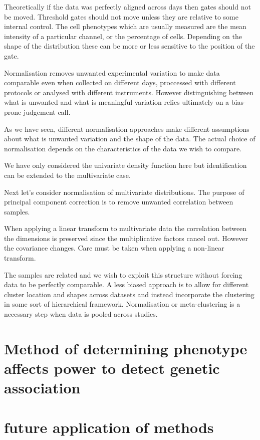 Theoretically if the data was perfectly aligned across days then gates should not be moved.  
Threshold gates should not move unless they are relative to some internal control.
The cell phenotypes which are usually measured are the mean intensity of a particular channel, or the percentage of cells.
Depending on the shape of the distribution these can be more or less sensitive to the position of the gate.

Normalisation removes unwanted experimental variation to make data comparable even when collected on different days,
proccessed with different protocols or analysed with different instruments.
However distinguishing between what is unwanted and what is meaningful variation relies ultimately on a bias-prone judgement call.

As we have seen, different normalisation approaches make different assumptions about what is unwanted variation and the shape of the data.
The actual choice of normalisation depends on the characteristics of the data we wish to compare.

We have only considered the univariate density function here but identification can be extended to the multivariate case.

Next let's consider normalisation of multivariate distributions.  
The purpose of principal component correction is to remove unwanted correlation between samples.

When applying a linear transform to multivariate data the correlation between the dimensions is preserved since the multiplicative factors cancel out.
However the covariance changes.
Care must be taken when applying a non-linear transform.  

The samples are related and we wish to exploit this structure without forcing data to be perfectly comparable.
A less biased approach is to allow for different cluster location and shapes across datasets and instead incorporate the clustering in some sort of hierarchical framework.  
Normalisation or meta-clustering is a necessary step when data is pooled across studies.





\section{ Method of determining phenotype affects power to detect genetic association }

\section{ future application of methods }



